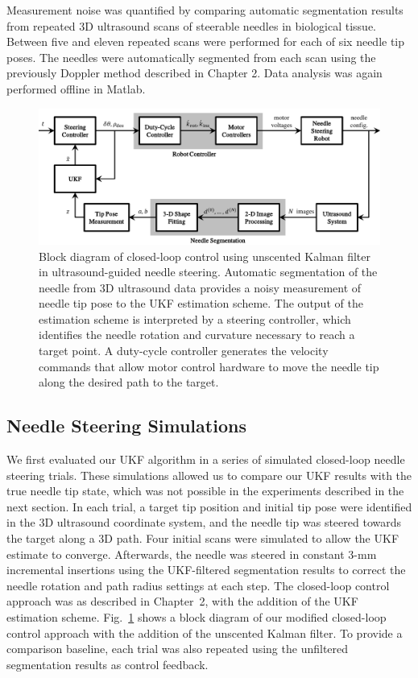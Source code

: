 Measurement noise was quantified by comparing automatic segmentation results from repeated 3D ultrasound scans of steerable needles in biological tissue. Between five and eleven repeated scans were performed for each of six needle tip poses. The needles were automatically segmented from each scan using the previously Doppler method described in Chapter 2. Data analysis was again performed offline in Matlab.

\begin{figure}[!t]
\centering
\includegraphics[width=\columnwidth]{Images/Chapter4/UKFBlockDiagram/UKFBlockDiagram}%
\caption[Block diagram of closed-loop control algorithm with UKF]{Block diagram of closed-loop control using unscented Kalman filter in ultrasound-guided needle steering. Automatic segmentation of the needle from 3D ultrasound data provides a noisy measurement of needle tip pose to the UKF estimation scheme. The output of the estimation scheme is interpreted by a steering controller, which identifies the needle rotation and curvature necessary to reach a target point. A duty-cycle controller generates the velocity commands that allow motor control hardware to move the needle tip along the desired path to the target.}
\label{fig:UKFBlockDiagram}
\end{figure}

\subsection{Needle Steering Simulations}
We first evaluated our UKF algorithm in a series of simulated closed-loop needle steering trials. These simulations allowed us to compare our UKF results with the true needle tip state, which was not possible in the experiments described in the next section. In each trial, a target tip position and initial tip pose were identified in the 3D ultrasound coordinate system, and the needle tip was steered towards the target along a 3D path. Four initial scans were simulated to allow the UKF estimate to converge. Afterwards, the needle was steered in constant 3-mm incremental insertions using the UKF-filtered segmentation results to correct the needle rotation and path radius settings at each step. The closed-loop control approach was as described in Chapter~2, with the addition of the UKF estimation scheme. Fig.~\ref{fig:UKFBlockDiagram} shows a block diagram of our modified closed-loop control approach with the addition of the unscented Kalman filter. To provide a comparison baseline, each trial was also repeated using the unfiltered segmentation results as control feedback. 

